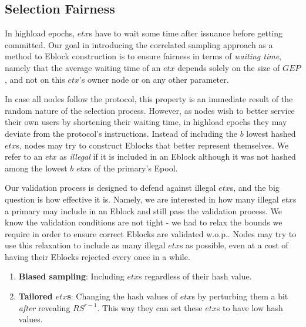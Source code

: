 \subsection{Selection Fairness}\label{subsec:selectionFairness}
In highload epochs, $etx$s have to wait some time after issuance before getting committed. Our goal in introducing the correlated sampling approach as a method to Eblock construction is to ensure fairness in terms of \textit{waiting time}, namely that the average waiting time of an $etx$ depends solely on the size of $GEP$, and not on this $etx$'s owner node or on any other parameter. 

In case all nodes follow the protocol, this property is an immediate result of the random nature of the selection process. However, as nodes wish to better service their own users by shortening their waiting time, in highload epochs they may deviate from the protocol's instructions. Instead of including the $b$ lowest hashed $etx$s, nodes may try to construct Eblocks that better represent themselves. We refer to an $etx$ as \textit{illegal} if it is included in an Eblock although it was not hashed among the lowest $b$ $etx$s of the primary's Epool.

Our validation process is designed to defend against illegal $etx$s, and the big question is how effective it is. Namely, we are interested in how many illegal $etx$s a primary may include in an Eblock and still pass the validation process. We know the validation conditions are not tight - we had to relax the bounds we require in order to ensure correct Eblocks are validated w.o.p.. Nodes may try to use this relaxation to include as many illegal $etx$s as possible, even at a cost of having their Eblocks rejected every once in a while. 

\begin{enumerate}
	\item \textbf{Biased sampling}: Including $etx$s regardless of their hash value. 
	\item \textbf{Tailored $etx$s}: Changing the hash values of $etx$s by perturbing them a bit \textit{after} revealing $RS^{r-1}$. This way they can set these $etx$s to have low hash values. 
\end{enumerate}

